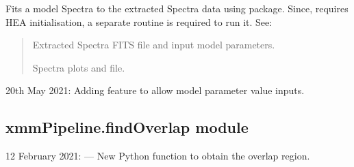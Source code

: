 \documentclass[letterpaper,10pt,english]{sphinxmanual}
\begin{document}
\begin{fulllineitems}
\begin{fulllineitems}
\label{\detokenize{xmmPipeline:xmmPipeline.epicSpectra.epicSpectra.xspec_fitSpectra}}
\pysigstartsignatures
{}
\pysigstopsignatures
\sphinxAtStartPar
Fits a model Spectra to the extracted Spectra data using  package.
Since,  requires HEA initialisation, a separate routine 
is required to run it.
See: 
\begin{quote}\begin{description}
\sphinxAtStartPar
Extracted Spectra FITS file and input model parameters.

\sphinxAtStartPar
Spectra plots and  file.

\end{description}\end{quote}

\sphinxAtStartPar
20th May 2021: Adding feature to allow model parameter value inputs.

\end{fulllineitems}


\end{fulllineitems}


\begin{fulllineitems}
\label{\detokenize{xmmPipeline:xmmPipeline.epicSpectra.main}}
\pysigstartsignatures
{}
\pysigstopsignatures
\end{fulllineitems}



\subsection{xmmPipeline.findOverlap module}
\label{\detokenize{xmmPipeline:module-xmmPipeline.findOverlap}}\label{\detokenize{xmmPipeline:xmmpipeline-findoverlap-module}}
\sphinxhyphen{}12 February 2021:
—
New Python function to obtain the overlap region.
\end{document}
